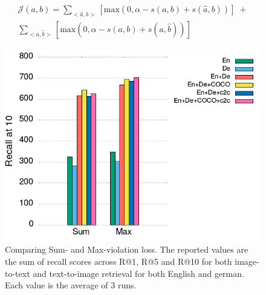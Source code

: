 \begin{equation}
\label{eq:sumviol}
\begin{split}
\mathcal{J}(a, b) = \sum_{<\hat{a}, b>}[\text{max}(0, \alpha - s(a,b) + s(\hat{a}, b))] \;+ \\ \sum_{<a, \hat{b}>}[\text{max}(0, \alpha - s(a,b) + s(a, \hat{b}))]
\end{split}
\end{equation}




\begin{figure}
    \centering
    \includegraphics[scale=0.45]{assets/summax.png}
    \caption{Comparing Sum- and Max-violation loss. The reported values are the sum of recall scores 
            across R@1, R@5 and R@10 for both image-to-text and text-to-image retrieval for both English and german.
            Each value is the average of 3 runs.}
    \label{fig:summax}
\end{figure}

